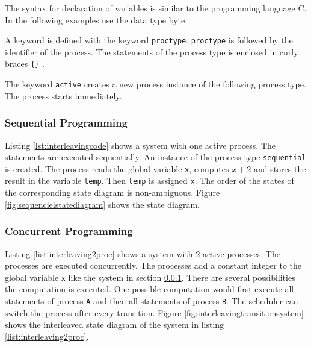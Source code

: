 \documentclass[12pt,a4paper,twoside]{article}
\begin{document}
The syntax for declaration of variables is similar to the programming language C. In the following examples use the data type byte.

A keyword is defined with the keyword \verb|proctype|. \verb|proctype| is followed by the identifier of the process. The statements of the process type is enclosed in curly braces \verb|{}| \cite{holzmann03}.

The keyword \verb|active| creates a new process instance of the following process type. The process starts immediately.

\subsubsection{Sequential Programming}
\label{sec:sequential}

Listing \ref{lst:interleavingcode} shows a system with one active process. The statements are executed sequentially. An instance of the process type \verb|sequential| is created. The process reads the global variable \verb|x|, computes $x+2$ and stores the result in the variable \verb|temp|. Then \verb|temp| is assigned \verb|x|. The order of the states of the corresponding state diagram is non-ambiguous. Figure \ref{fig:sequencielstatediagram} shows the state diagram.

   

\subsubsection{Concurrent Programming}
\label{sec:concurrent}

Listing \ref{list:interleaving2proc} shows a system with 2 active processes. The processes are executed concurrently. The processes add a constant integer to the global variable \verb|x| like the system in section \ref{sec:sequential}. There are several possibilities the computation is executed. One possible computation would first execute all statements of process \verb|A| and then all statements of process \verb|B|. The scheduler can switch the process after every transition. Figure \ref{fig:interleavingtransitionsystem} shows the interleaved state diagram of the system in listing \ref{list:interleaving2proc}.

    
\end{document}
